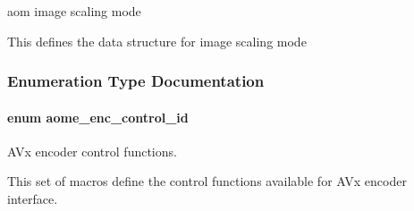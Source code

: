 aom image scaling mode 

This defines the data structure for image scaling mode 

\subsubsection{Enumeration Type Documentation}
\paragraph[{\texorpdfstring{aome\+\_\+enc\+\_\+control\+\_\+id}{aome_enc_control_id}}]{\setlength{\rightskip}{0pt plus 5cm}enum {\bf aome\+\_\+enc\+\_\+control\+\_\+id}}\hypertarget{group__aom__encoder_gae78dde67a6d78f332e9bdba0dde42db5}{}\label{group__aom__encoder_gae78dde67a6d78f332e9bdba0dde42db5}


A\+Vx encoder control functions. 

This set of macros define the control functions available for A\+Vx encoder interface.

